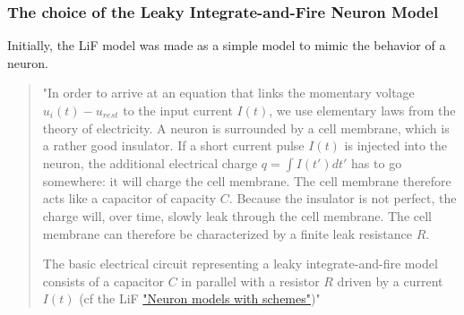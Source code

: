 \documentclass[11pt]{article}
\begin{document}
\subsubsection{The choice of the Leaky Integrate-and-Fire Neuron Model}

Initially, the LiF model was made as a simple model to mimic the behavior of a neuron.
\begin{quote}
  "In order to arrive at an equation that links the momentary voltage $u_i(t) - u_{rest}$ to the input current $I(t)$, we use elementary laws from the theory of electricity. A neuron is surrounded by a cell membrane, which is a rather good insulator. If a short current pulse $I(t)$ is injected into the neuron, the additional electrical charge $q= \int I(t')dt'$ has to go somewhere: it will charge the cell membrane. The cell membrane therefore acts like a capacitor of capacity $C$. Because the insulator is not perfect, the charge will, over time, slowly leak through the cell membrane. The cell membrane can therefore be characterized by a finite leak resistance $R$.

  The basic electrical circuit representing a leaky integrate-and-fire model consists of a capacitor $C$ in parallel with a resistor $R$ driven by a current $I(t)$ (cf the LiF \hyperref[fig:comparison_neuron]{"Neuron models with schemes"})"\cite{gerstner2014neuronal}
\end{quote}
\end{document}
